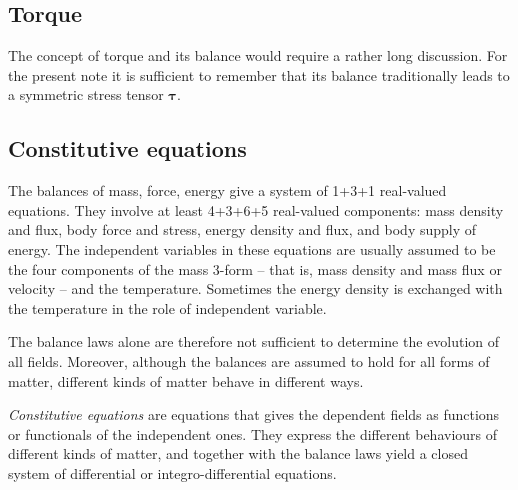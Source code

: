 \documentclass[\ifafour a4paper,12pt,\else a5paper,10pt,\fi%
onecolumn,oneside,article,%
british%
]{memoir}
\theoremstyle{remark}
\theoremstyle{innote}
\newcommand*{\de}{\partialup}%
\renewcommand*{\|}{\nonscript\,\vert\nonscript\;\mathopen{}}
\newcommand*{\Li}{\mathrm{L}}
\newcommand*{\yqq}{q}
\newcommand*{\yq}{\bm{\yqq}}
\newcommand*{\yTT}{\tau}
\newcommand*{\yT}{\bm{\yTT}}
\newcommand*{\yvvt}{v}
\newcommand*{\yvt}{\bm{\yvvt}}
\newcommand*{\yFF}{U}
\newcommand*{\yF}{\bm{\yFF}}
\newcommand*{\yFi}{\yF^{\mathord{\star}}}
\newcommand*{\yff}{f}
\newcommand*{\yf}{\bm{\yff}}
\newcommand*{\ye}{\epsilon}
\newcommand*{\ynab}{\nabla}
\begin{document}



\subsection{Torque}

The concept of torque and its balance would require a rather long
discussion. For the present note it is sufficient to remember that its
balance traditionally leads to a symmetric stress tensor $\yT$.

\subsection{Constitutive equations}

The balances of mass, force, energy give a system of 1+3+1 real-valued
equations. They involve at least 4+3+6+5 real-valued components: mass
density and flux, body force and stress, energy density and flux, and body
supply of energy. The independent variables in these equations are usually
assumed to be the four components of the mass 3-form -- that is, mass
density and mass flux or velocity -- and the temperature. Sometimes the
energy density is exchanged with the temperature in the role of independent
variable.

The balance laws alone are therefore not sufficient to determine the
evolution of all fields. Moreover, although the balances are assumed to
hold for all forms of matter, different kinds of matter behave in different
ways.

\emph{Constitutive equations} are equations that gives the dependent fields
as functions or functionals of the independent ones. They express the
different behaviours of different kinds of matter, and together with the
balance laws yield a closed system of differential or integro-differential
equations.
\end{document}
